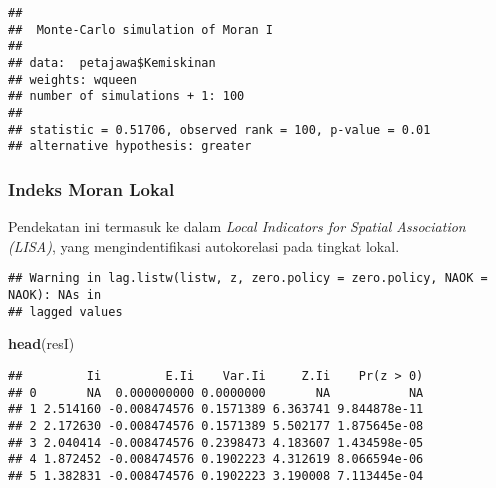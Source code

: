 \documentclass[
]{book}
\newenvironment{Shaded}{\begin{snugshade}}{\end{snugshade}}
\newcommand{\KeywordTok}[1]{\textcolor[rgb]{0.13,0.29,0.53}{\textbf{#1}}}
\newcommand{\NormalTok}[1]{#1}
\newcommand{\OperatorTok}[1]{\textcolor[rgb]{0.81,0.36,0.00}{\textbf{#1}}}
\newcommand{\StringTok}[1]{\textcolor[rgb]{0.31,0.60,0.02}{#1}}
\begin{document}
\begin{verbatim}
## 
##  Monte-Carlo simulation of Moran I
## 
## data:  petajawa$Kemiskinan 
## weights: wqueen  
## number of simulations + 1: 100 
## 
## statistic = 0.51706, observed rank = 100, p-value = 0.01
## alternative hypothesis: greater
\end{verbatim}

\hypertarget{indeks-moran-lokal}{%
\subsubsection{Indeks Moran Lokal}\label{indeks-moran-lokal}}

Pendekatan ini termasuk ke dalam \emph{Local Indicators for Spatial Association (LISA)}, yang mengindentifikasi autokorelasi pada tingkat lokal.

\begin{Shaded}
\end{Shaded}

\begin{verbatim}
## Warning in lag.listw(listw, z, zero.policy = zero.policy, NAOK = NAOK): NAs in
## lagged values
\end{verbatim}

\begin{Shaded}
\begin{Highlighting}[]
\KeywordTok{head}\NormalTok{(resI)}
\end{Highlighting}
\end{Shaded}

\begin{verbatim}
##         Ii         E.Ii    Var.Ii     Z.Ii    Pr(z > 0)
## 0       NA  0.000000000 0.0000000       NA           NA
## 1 2.514160 -0.008474576 0.1571389 6.363741 9.844878e-11
## 2 2.172630 -0.008474576 0.1571389 5.502177 1.875645e-08
## 3 2.040414 -0.008474576 0.2398473 4.183607 1.434598e-05
## 4 1.872452 -0.008474576 0.1902223 4.312619 8.066594e-06
## 5 1.382831 -0.008474576 0.1902223 3.190008 7.113445e-04
\end{verbatim}
\end{document}
